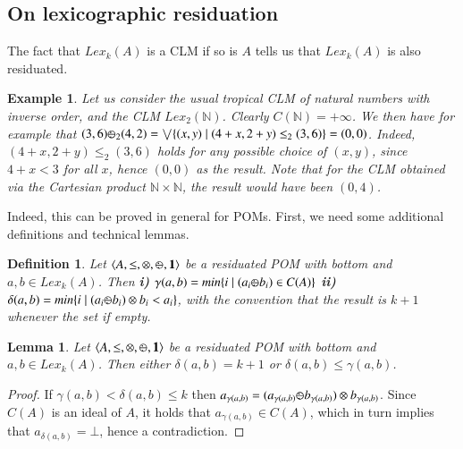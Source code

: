 \documentclass[a4paper]{elsarticle}
\newtheorem{definition}{Definition}
\newtheorem{example}{Example}
\newtheorem{lemma}{Lemma}
\newcommand{\monop}{\otimes}
\newcommand{\1}{\mathbf{1}}
\def\odiv{{ \ominus\hspace{-8pt}:}\;}
\begin{document}
\subsection{On lexicographic residuation}
The fact that $Lex_k(A)$ is a CLM if so is $A$ tells us that $Lex_k(A)$ is
also residuated. 

\begin{example}
	Let us consider the usual tropical CLM of natural numbers with inverse order,
	and the CLM $Lex_{2}(\mathbb N)$. Clearly $C(\mathbb N) = +\infty$. We then have for example
	that
	$(3, 6) \odiv_2 (4, 2) = \bigvee \{(x, y) \mid (4 + x, 2 + y) \leq_2 (3, 6)\} = (0,0)$.
	Indeed, $(4 + x, 2 + y) \leq_2 (3, 6)$ holds for any possible choice of $(x, y)$,
	since $4 + x < 3$ for all $x$, hence $(0,0)$ as the result.
	Note that  for the CLM obtained via the Cartesian product $\mathbb N \times \mathbb N$, the 
	result would have been $(0, 4)$.
\end{example}

Indeed, this can be proved in general for POMs. First, we need some additional definitions and technical lemmas.

\begin{definition}
	Let $\langle A, \leq, \monop, \odiv, \1 \rangle$
	be a residuated POM with bottom and $a, b \in Lex_k(A)$. Then 
		{\bf i)} $\gamma(a, b) = min\{ i \mid (a_i \odiv b_i) \in C(A)\}$
		{\bf ii)} $\delta(a, b) = min\{ i \mid (a_i \odiv b_i) \otimes b_i < a_i\}$,
	with the convention that the result is $k+1$ whenever the set if empty.
\end{definition}


\begin{lemma}\label{limit}
	Let $\langle A, \leq, \monop, \odiv, \1 \rangle$
	be a residuated POM with bottom and $a, b \in Lex_k(A)$. Then 
	either $\delta(a,b) = k+1$ or $\delta(a,b) \leq \gamma(a,b)$.
\end{lemma}
\begin{proof}
	If $\gamma(a,b) < \delta(a,b) \leq k$ then 
	$a_{\gamma(a,b)}  = 
	(a_{\gamma(a,b)} \odiv b_{\gamma(a,b)}) \otimes b_{\gamma(a,b)}$.
	Since $C(A)$ is an ideal of $A$, it holds that $a_{\gamma(a,b)} \in C(A)$, 
	which in turn implies that $a_{\delta(a,b)} = \bot$,
	hence a contradiction.
\end{proof}
\end{document}
